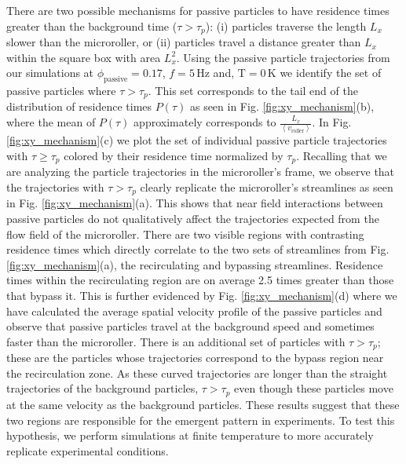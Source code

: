 \documentclass[12pt]{article}
\begin{document}
There are two possible mechanisms for passive particles to have residence times greater than the background time ($\tau > \tau_{p}$): (i) particles traverse the length $L_x$ slower than the microroller, or (ii) particles travel a distance greater than $L_x$ within the square box with area $L_x^2$. Using the passive particle trajectories from our simulations at $\phi_\mathrm{passive} = 0.17$, $ f = 5 \, \mathrm{Hz}$ and, $\mathrm{T} = 0 \, \mathrm{K}$ we identify the set of passive particles where $\tau > \tau_p$. This set corresponds to the tail end of the distribution of residence times $P(\tau)$ as seen in Fig. \ref{fig:xy_mechanism}(b), where the mean of $P(\tau)$ approximately corresponds to $\frac{L_x}{\left< v_\mathrm{roller} \right> }$. In Fig. \ref{fig:xy_mechanism}(c) we plot the set of individual passive particle trajectories with $ \tau \geq \tau_p$ colored by their residence time normalized by $\tau_p$. Recalling that we are analyzing the particle trajectories in the microroller's frame, we observe that the trajectories with $\tau > \tau_p$ clearly replicate the microroller's streamlines as seen in Fig. \ref{fig:xy_mechanism}(a). This shows that near field interactions between passive particles do not qualitatively affect the trajectories expected from the flow field of the microroller. There are two visible regions with contrasting residence times which directly correlate to the two sets of streamlines from Fig. \ref{fig:xy_mechanism}(a), the recirculating and bypassing streamlines. Residence times within the recirculating region are on average 2.5 times greater than those that bypass it. This is further evidenced by Fig. \ref{fig:xy_mechanism}(d) where we have calculated the average spatial velocity profile of the passive particles and observe that passive particles travel at the background speed and sometimes faster than the microroller. There is an additional set of particles with $\tau > \tau_p$; these are the particles whose trajectories correspond to the bypass region near the recirculation zone. As these curved trajectories are longer than the straight trajectories of the background particles, $\tau > \tau_p$ even though these particles move at the same velocity as the background particles. These results suggest that these two regions are responsible for the emergent pattern in experiments. To test this hypothesis, we perform simulations at finite temperature to more accurately replicate experimental conditions. 

\end{document}
